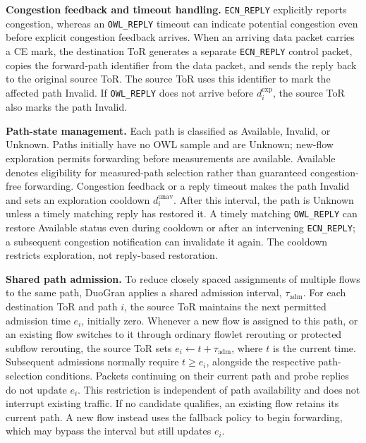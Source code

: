 \documentclass[10pt,journal,compsoc]{IEEEtran}
\begin{document}
\noindent
\textbf{Congestion feedback and timeout handling.} \texttt{ECN\_REPLY} explicitly reports congestion, whereas an \texttt{OWL\_REPLY} timeout can indicate potential congestion even before explicit congestion feedback arrives. When an arriving data packet carries a CE mark, the destination ToR generates a separate \texttt{ECN\_REPLY} control packet, copies the forward-path identifier from the data packet, and sends the reply back to the original source ToR. The source ToR uses this identifier to mark the affected path Invalid. If \texttt{OWL\_REPLY} does not arrive before $d_i^{\mathrm{exp}}$, the source ToR also marks the path Invalid.

\noindent
\textbf{Path-state management.} Each path is classified as Available, Invalid, or Unknown. Paths initially have no OWL sample and are Unknown; new-flow exploration permits forwarding before measurements are available. Available denotes eligibility for measured-path selection rather than guaranteed congestion-free forwarding. Congestion feedback or a reply timeout makes the path Invalid and sets an exploration cooldown $d_i^{\mathrm{unav}}$. After this interval, the path is Unknown unless a timely matching reply has restored it. A timely matching \texttt{OWL\_REPLY} can restore Available status even during cooldown or after an intervening \texttt{ECN\_REPLY}; a subsequent congestion notification can invalidate it again. The cooldown restricts exploration, not reply-based restoration.

\noindent
\textbf{Shared path admission.} To reduce closely spaced assignments of multiple flows to the same path, DuoGran applies a shared admission interval, $\tau_{\mathrm{adm}}$. For each destination ToR and path $i$, the source ToR maintains the next permitted admission time $e_i$, initially zero. Whenever a new flow is assigned to this path, or an existing flow switches to it through ordinary flowlet rerouting or protected subflow rerouting, the source ToR sets $e_i \leftarrow t+\tau_{\mathrm{adm}}$, where $t$ is the current time. Subsequent admissions normally require $t\geq e_i$, alongside the respective path-selection conditions. Packets continuing on their current path and probe replies do not update $e_i$. This restriction is independent of path availability and does not interrupt existing traffic. If no candidate qualifies, an existing flow retains its current path. A new flow instead uses the fallback policy to begin forwarding, which may bypass the interval but still updates $e_i$.
\end{document}
